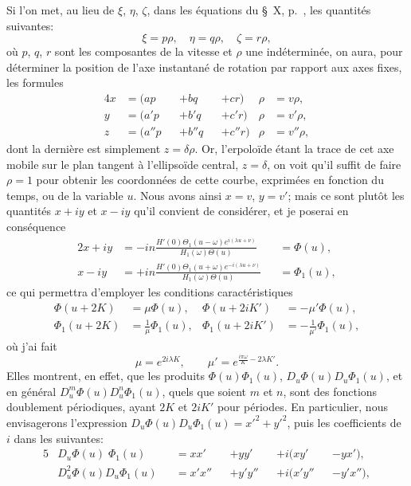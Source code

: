 \documentclass[11pt,leqno,oneside,letterpaper]{book}[2005/09/16]
\begin{document}
Si l'on met, au lieu de $\xi$, $\eta$, $\zeta$, dans les \'equations du \S~X,
p.~\pageref{page23}, les quantit\'es suivantes:
\[
  \xi = p\rho, \quad  \eta = q\rho, \quad  \zeta = r\rho,
\]
o\`u $p$, $q$, $r$ sont les composantes de la vitesse et $\rho$ une ind\'etermin\'ee, on aura,
pour d\'eterminer la position de l'axe instantan\'e de rotation par rapport
aux axes fixes, les formules
\begin{alignat*}{4}
  x &=  (a  p && + b  q && + c  r) &\rho &= v  \rho, \\
  y &=  (a' p && + b' q && + c' r) &\rho &= v' \rho, \\
  z &=  (a''p && + b''q && + c''r) &\rho &= v''\rho,
\end{alignat*}
dont la derni\`ere est simplement $z = \delta\rho$. Or, l'erpolo\"ide \'etant la trace de cet
axe mobile sur le plan tangent \`a l'ellipso\"ide central, $z = \delta$, on voit qu'il
suffit de faire $\rho = 1$ pour obtenir les coordonn\'ees de cette courbe, exprim\'ees
en fonction du temps, ou de la variable $u$. Nous avons ainsi $x = v$,
$y = v'$; mais ce sont plut\^ot les quantit\'es $x + iy$ et $x - iy$ qu'il convient
de consid\'erer, et je poserai en cons\'equence
\begin{alignat*}{2}
  x + iy
&= -in\frac{ H'(0) \Theta_1(u-\omega) e^{ i(\lambda u+\nu)} }{ H_1(\omega) \Theta(u)}
&&= \Phi(u),\\
  x - iy
&= +in\frac{ H'(0) \Theta_1(u+\omega) e^{-i(\lambda u+\nu)} }{ H_1(\omega) \Theta(u)}
&&= \Phi_1(u),
\end{alignat*}
ce qui permettra d'employer les conditions caract\'eristiques
\begin{align*}
  \Phi(u+2 K ) &= \mu \Phi(u),
& \Phi(u+2iK') &=-\mu'\Phi(u),
\\
  \Phi_1(u+2 K ) &= \frac{1}{\mu} \Phi_1(u),
& \Phi_1(u+2iK') &=-\frac{1}{\mu'} \Phi_1(u),
\end{align*}
o\`u j'ai fait
\[
  \mu  = e^{2i\lambda K}, \qquad
  \mu' = e^{\frac{i\pi\omega}{K} - 2\lambda K'} .
\]
Elles montrent, en effet, que les produits
$\Phi(u)\Phi_1(u)$, $D_u \Phi(u) D_u \Phi_1(u)$, et en
g\'en\'eral $D_u^m \Phi(u) D_u^n \Phi_1(u)$, quels que soient $m$ et $n$, sont des fonctions doublement
p\'eriodiques, ayant $2K$ et $2iK'$ pour p\'eriodes. En particulier,
nous envisagerons l'expression
$D_u \Phi(u) D_u \Phi_1(u) = x'^2 + y'^2$, puis les
coefficients de $i$ dans les suivantes:
\begin{alignat*}{5}
  &D_u\Phi(u)\;\Phi_1(u)      &&= xx' &&+ yy' &&+ i(xy' &&- yx'), \\[1ex]
  &D^2_u\Phi(u)D_u\Phi_1(u) &&= x'x'' &&+y'y'' &&+ i(x'y'' &&-y'x''),
\end{alignat*}
\end{document}
